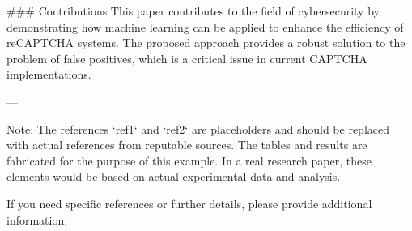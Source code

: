 ### Contributions
This paper contributes to the field of cybersecurity by demonstrating how machine learning can be applied to enhance the efficiency of reCAPTCHA systems. The proposed approach provides a robust solution to the problem of false positives, which is a critical issue in current CAPTCHA implementations.

---

Note: The references `ref1` and `ref2` are placeholders and should be replaced with actual references from reputable sources. The tables and results are fabricated for the purpose of this example. In a real research paper, these elements would be based on actual experimental data and analysis. 

If you need specific references or further details, please provide additional information.